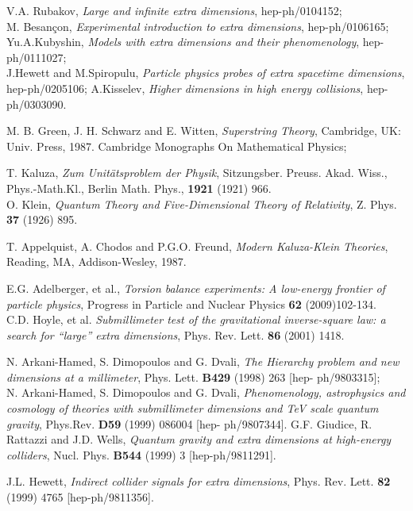 \documentclass{cernyrep}
\begin{document}
\begin{thebibliography}{100}
V.A. Rubakov, {\it Large and infinite extra dimensions},
hep-ph/0104152;\\
 M. Besan{\c c}on, {\it Experimental introduction to
extra dimensions}, hep-ph/0106165;\\
Yu.A.Kubyshin, {\it Models with extra dimensions and their phenomenology},
hep-ph/0111027;  \\
J.Hewett and M.Spiropulu, {\it Particle physics probes of extra
spacetime dimensions}, hep-ph/0205106; A.Kisselev, {\it Higher
dimensions in high energy collisions}, hep-ph/0303090.

M. B. Green, J. H. Schwarz and E. Witten, {\it Superstring Theory}, Cambridge, UK: Univ.
Press, 1987. Cambridge Monographs On Mathematical Physics; 

T. Kaluza, {\it Zum Unitätsproblem der Physik}, Sitzungsber. Preuss. Akad. Wiss., Phys.-Math.Kl., Berlin Math. Phys., {\bf 1921}
(1921) 966.\\
O. Klein, {\it Quantum Theory and Five-Dimensional Theory of Relativity}, Z. Phys. {\bf 37} (1926) 895.


T. Appelquist, A. Chodos and P.G.O. Freund, {\it Modern Kaluza-Klein Theories},  Reading,
MA, Addison-Wesley, 1987.

E.G. Adelberger,  et al., {\it Torsion balance experiments: A low-energy frontier of particle physics}, Progress in Particle and Nuclear Physics {\bf 62} (2009)102-134.\\
C.D. Hoyle, et al. {\it Submillimeter test of the gravitational inverse-square law: a search for “large” extra dimensions},  Phys. Rev. Lett. {\bf 86} (2001) 1418.

N. Arkani-Hamed, S. Dimopoulos and G. Dvali, {\it The Hierarchy problem and new dimensions at a millimeter}, Phys. Lett. {\bf B429} (1998) 263 [hep-
ph/9803315];\\
N. Arkani-Hamed, S. Dimopoulos and G. Dvali, {\it Phenomenology, astrophysics and cosmology of theories with submillimeter dimensions and TeV scale quantum gravity}, Phys.Rev. {\bf D59} (1999) 086004 [hep- ph/9807344].
 G.F. Giudice, R. Rattazzi and J.D. Wells, {\em Quantum gravity and extra dimensions at high-energy colliders}, Nucl. Phys.
{\bf B544} (1999) 3 [hep-ph/9811291].

 J.L. Hewett, {\em Indirect collider signals for extra dimensions}, Phys. Rev. Lett. {\bf 82} (1999) 4765
[hep-ph/9811356].


\end{thebibliography}
\end{document}
